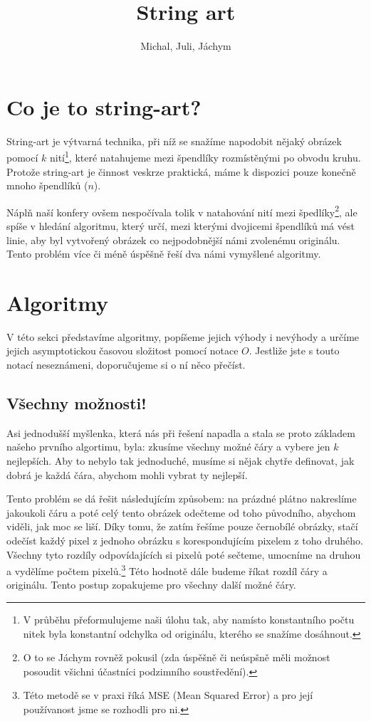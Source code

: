 \documentclass{article}
\author{Michal, Juli, Jáchym}
\title{String art}
\begin{document}
\maketitle

\section{Co je to string-art?}
\label{sec:string-art}
String-art je výtvarná technika, při níž se snažíme napodobit nějaký obrázek
pomocí $k$ nití\footnote{V průběhu přeformulujeme naši úlohu tak, aby namísto
konstantního počtu nitek byla konstantní odchylka od originálu, kterého se snažíme
dosáhnout.}, které natahujeme mezi špendlíky rozmístěnými po obvodu kruhu. Protože 
string-art je činnost veskrze praktická, máme k dispozici pouze konečně mnoho 
špendlíků ($n$).

Náplň naší konfery ovšem nespočívala tolik v natahování nití mezi špedlíky\footnote{O
to se Jáchym rovněž pokusil (zda úspěšně či neúspšně měli možnost posoudit všichni 
účastníci podzimního soustředění).}, ale spíše v hledání algoritmu, který určí, mezi
kterými dvojicemi špendlíků má vést linie, aby byl vytvořený obrázek co nejpodobnější
námi zvolenému originálu. Tento problém více či méně úspěšně řeší dva námi vymyšlené
algoritmy.


\section{Algoritmy}
\label{sec:algoritmy}
V této sekci představíme algoritmy, popíšeme jejich výhody i nevýhody a určíme
jejich asymptotickou časovou složitost pomocí notace $O$. Jestliže
jste s touto notací neseznámeni, doporučujeme si o ní něco přečíst.

\subsection{Všechny možnosti!}
\label{ssec:vsechny-moznosti}
Asi jednodušší myšlenka, která nás při řešení napadla a stala se proto základem 
našeho prvního algortimu, byla:
zkusíme všechny možné čáry a vybere jen $k$ nejlepších.
Aby to nebylo tak jednoduché, musíme si nějak chytře definovat, jak dobrá je každá
čára, abychom mohli vybrat ty nejlepší.

Tento problém se dá řešit následujícím způsobem: na prázdné plátno nakreslíme
jakoukoli čáru a poté celý tento obrázek odečteme od toho původního, abychom 
viděli, jak moc se liší. Díky tomu, že zatím řešíme pouze černobílé obrázky, 
stačí odečíst každý pixel z jednoho obrázku s korespondujícím pixelem z toho 
druhého. Všechny tyto rozdíly odpovídajících si pixelů poté sečteme, umocníme 
na druhou a vydělíme počtem pixelů.\footnote{Této metodě se v praxi říká MSE 
(Mean Squared Error) a pro její používanost jsme se rozhodli pro ni.} Této hodnotě
dále budeme říkat rozdíl čáry a originálu. Tento postup zopakujeme pro všechny 
další možné čáry.
\end{document}
